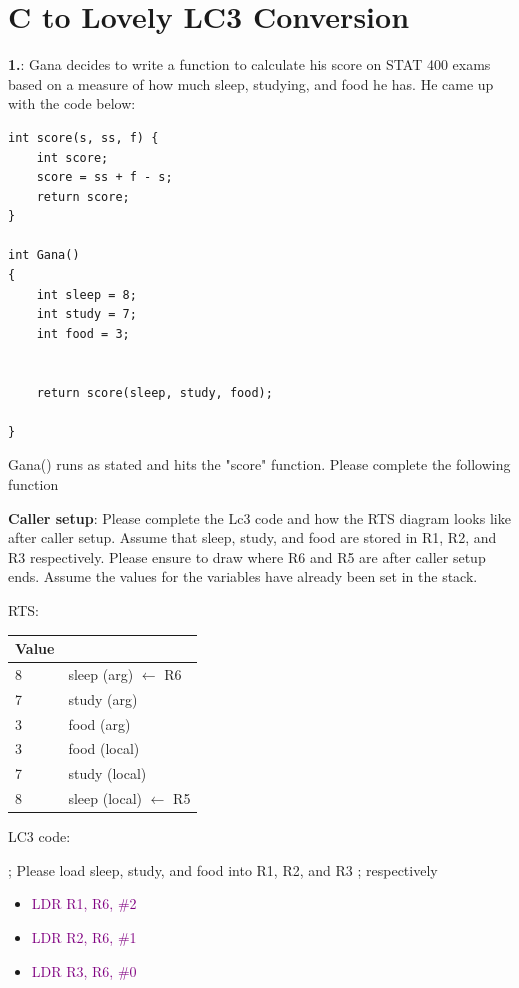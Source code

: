 \documentclass{article}
\begin{document}
\newpage
\section{C to Lovely LC3 Conversion}

\textbf{1.}: Gana decides to write a function to calculate his score on STAT 400 exams based on a measure of how much sleep, studying, and food he has. He came up with the code below:

        \begin{lstlisting}[style=CStyle]
int score(s, ss, f) {
    int score;
    score = ss + f - s;
    return score;
}

int Gana()
{
    int sleep = 8;
    int study = 7;
    int food = 3;


    return score(sleep, study, food);

} \end{lstlisting}
  Gana() runs as stated and hits the "score" function. Please complete the following function

 \textbf{Caller setup}: Please complete the Lc3 code and how the RTS diagram looks like after caller setup. Assume that sleep, study, and food are stored in R1, R2, and R3 respectively. Please ensure to draw where R6 and R5 are after caller setup ends. Assume the values for the variables have already been set in the stack.

RTS:

\begin{center}

\begin{tabular}{|p{3cm} p{3cm} |} 
\hline
 Value &   \\ [0.5ex] 
 \hline\hline
 8 & sleep (arg) $\xleftarrow{}$ R6\\ 
 \hline
 7 & study (arg)\\
 \hline
 3 & food (arg) \\
 \hline
 3 & food (local) \\
 \hline
 7 & study (local)\\ [1ex]
 \hline
  8 & sleep (local) $\xleftarrow{}$ R5 \\ [1ex]
  \hline
 
\end{tabular}
\end{center}

      
LC3 code: 

; Please load sleep, study, and food into R1, R2, and R3 
 ; respectively 
 
 \begin{itemize}
 
    \item  \textcolor{purple}{LDR  R1, R6, \#2 }
    \item    \textcolor{purple}{LDR R2, R6, \#1 }
    \item    \textcolor{purple}{LDR R3, R6, \#0 }
    
\end{itemize}
 
\end{document}
